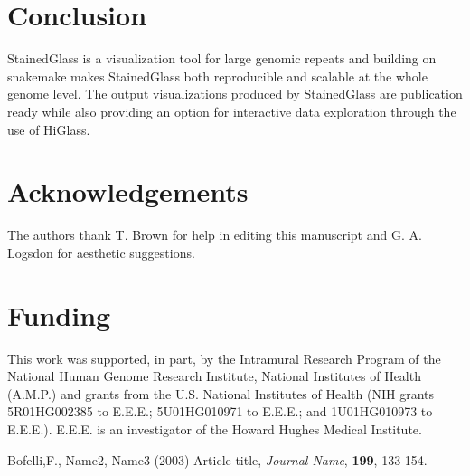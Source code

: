 \documentclass{bioinfo}
\begin{document}
\section{Conclusion}
StainedGlass is a visualization tool for large genomic repeats and building
on snakemake makes StainedGlass both reproducible and scalable at the whole
genome level.
The output visualizations produced by StainedGlass are publication ready while also 
providing an option for interactive data exploration through the use of HiGlass.

\section*{Acknowledgements}
The authors thank T. Brown for help in editing this manuscript 
and G. A. Logsdon for aesthetic suggestions.

\section*{Funding}
This work was supported, in part,
by the Intramural Research Program of the National Human Genome Research Institute,
National Institutes of Health (A.M.P.) and grants from the U.S. National Institutes of
Health (NIH grants 5R01HG002385 to E.E.E.; 5U01HG010971 to E.E.E.; and 1U01HG010973 to
E.E.E.). E.E.E. is an investigator of the Howard Hughes Medical Institute.

%
%
%
%
%
%
%
%
%


\begin{thebibliography}{}

Bofelli,F., Name2, Name3 (2003) Article title, {\it Journal Name}, {\bf 199}, 133-154.


\end{thebibliography}
\end{document}
